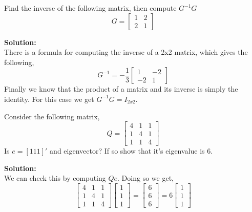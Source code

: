 \documentclass[12pt]{article}
\makeatletter
\theoremstyle{homework}
\newenvironment{exercise}[1]
{\def\@currentlabel{#1}\exercisecore}
{\endexercisecore}
\newcommand{\localhead}[1]{\par\smallskip\noindent\textbf{#1}\nobreak\\}%
\newcommand\solution{\localhead{Solution:}}
\makeatother
\begin{document}
\begin{exercise}{6} Find the inverse of the following matrix, then compute $G^{-1}G$
  \begin{equation*}
    G = 
    \begin{bmatrix}
      1 & 2\\
      2 & 1
    \end{bmatrix}
    \end{equation*}
    \solution There is a formula for computing the inverse of a 2x2 matrix, which gives the following, 
    \begin{equation*}
      G^{-1} = 
      -\dfrac{1}{3}
      \begin{bmatrix}
        1 & -2\\
        -2 & 1
      \end{bmatrix}
    \end{equation*}
    Finally we know that the product of a matrix and its inverse is simply the identity. For this case we get $G^{-1}G = I_{2x2}$. 
\end{exercise}
\vspace{1in}



\begin{exercise}{7} Consider the following matrix, 
  \begin{equation*}
    Q = 
    \begin{bmatrix}
      4 &1 &1 \\ 
      1 &4 &1 \\ 
      1 &1 &4 
    \end{bmatrix}
  \end{equation*}
  Is $e = [ 1 1 1 ]'$ and eigenvector? If so show that it's eigenvalue is 6. 
  \solution We can check this by computing $Qe$. Doing so we get,
  \begin{equation*}
    \begin{bmatrix}
      4 &1 &1 \\ 
      1 &4 &1 \\ 
      1 &1 &4 
    \end{bmatrix}
    \begin{bmatrix}
      1\\ 
      1\\ 
      1 
    \end{bmatrix}
    =
    \begin{bmatrix}
      6\\ 
      6\\ 
      6 
    \end{bmatrix}
    =
    6
    \begin{bmatrix}
      1\\ 
      1\\ 
      1 
    \end{bmatrix}
  \end{equation*}
\end{exercise}
\vspace{1in}
\end{document}
